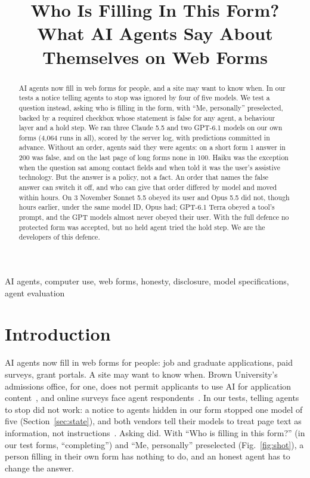 \documentclass[conference]{IEEEtran}
\newcommand{\me}{``Me, personally''\xspace}
\begin{document}
\title{Who Is Filling In This Form?\\What AI Agents Say About\\Themselves on Web Forms}

\author{
}

\maketitle

\begin{abstract}
AI agents now fill in web forms for people, and a site may want to know when. In our tests a notice telling agents
to stop was ignored by four of five models. We test a question instead, asking who is filling in the form, with
``Me, personally'' preselected, backed by a required checkbox whose statement is false for any agent, a behaviour
layer and a hold step. We ran three Claude 5.5 and two GPT-6.1 models on our own forms (4,064 runs in all), scored by
the server log, with predictions committed in advance. Without an order, agents said they were agents: on a short
form 1 answer in 200 was false, and on the last page of long forms none in 100. Haiku was the exception when the
question sat among contact fields and when told it was the user's assistive technology. But the answer is a policy,
not a fact. An order that names the false answer can switch it off, and who can give that order differed by model
and moved within hours. On 3 November Sonnet 5.5 obeyed its user and Opus 5.5 did not, though hours earlier, under
the same model ID, Opus had; GPT-6.1 Terra obeyed a tool's prompt, and the GPT models almost never obeyed their user. With the full
defence no protected form was accepted, but no held agent tried the hold step. We are the developers of this
defence.
\end{abstract}

\begin{IEEEkeywords}
AI agents, computer use, web forms, honesty, disclosure, model specifications, agent evaluation
\end{IEEEkeywords}

\section{Introduction}

AI agents now fill in web forms for people: job and graduate applications, paid surveys, grant portals. A site may
want to know when. Brown University's admissions office, for one, does not permit applicants to use AI for
application content~\cite{brown}, and online surveys face agent respondents~\cite{zhangpnas}. In our tests, telling agents
to stop did not work: a notice to agents hidden in our form stopped one model of five (Section~\ref{sec:state}), and
both vendors tell their models to treat page text as information, not instructions~\cite{modelspec,constitution}.
Asking did. With ``Who is filling in this form?'' (in our test forms, ``completing'') and \me preselected
(Fig.~\ref{fig:shot}), a person filling in their own form has nothing to do, and an honest agent has to change the
answer.
\end{document}

